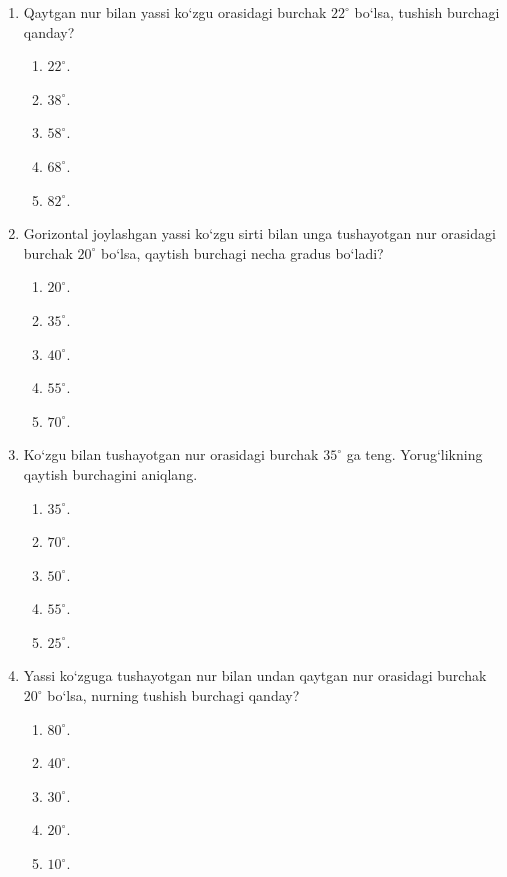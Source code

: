 \begin{enumerate}

\begin{enumerate}[label=\Alph*)]
\item $50^\circ$
\item $70^\circ$
\item $40^\circ$
\item $20^\circ$
\item $10^\circ$
\end{enumerate}

\item Qaytgan nur bilan yassi ko‘zgu orasidagi burchak $22^\circ$ bo‘lsa, tushish burchagi qanday?
\begin{enumerate}[label=\Alph*)]
\item $22^\circ$.
\item $38^\circ$.
\item $58^\circ$.
\item $68^\circ$.
\item $82^\circ$.
\end{enumerate}

\item Gorizontal joylashgan yassi ko‘zgu sirti bilan unga tushayotgan nur orasidagi burchak $20^\circ$ bo‘lsa, qaytish burchagi necha gradus bo‘ladi?
\begin{enumerate}[label=\Alph*)]
\item $20^\circ$.
\item $35^\circ$.
\item $40^\circ$.
\item $55^\circ$.
\item $70^\circ$.
\end{enumerate}

\item Ko‘zgu bilan tushayotgan nur orasidagi burchak $35^\circ$ ga teng. Yorug‘likning qaytish burchagini aniqlang.
\begin{enumerate}[label=\Alph*)]
\item $35^\circ$.
\item $70^\circ$.
\item $50^\circ$.
\item $55^\circ$.
\item $25^\circ$.
\end{enumerate}

\item Yassi ko‘zguga tushayotgan nur bilan undan qaytgan nur orasidagi burchak $20^\circ$ bo‘lsa, nurning tushish burchagi qanday?
\begin{enumerate}[label=\Alph*)]
\item $80^\circ$.
\item $40^\circ$.
\item $30^\circ$.
\item $20^\circ$.
\item $10^\circ$.
\end{enumerate}


\end{enumerate}
